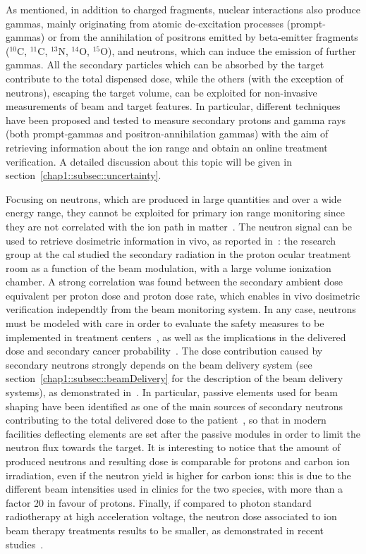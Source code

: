 As mentioned, in addition to charged fragments, nuclear interactions also produce gammas, mainly originating from atomic de-excitation processes (prompt-gammas) or from the annihilation of positrons emitted by beta-emitter fragments ($^{10}$C, $^{11}$C, $^{13}$N, $^{14}$O, $^{15}$O), and neutrons, which can induce the emission of further gammas. All the secondary particles which can be absorbed by the target contribute to the total dispensed dose, while the others (with the exception of neutrons), escaping the target volume, can be exploited for non-invasive measurements of beam and target features. In particular, different techniques have been proposed and tested to measure secondary protons and gamma rays (both prompt-gammas and positron-annihilation gammas) with the aim of retrieving information about the ion range and obtain an online treatment verification. A detailed discussion about this topic will be given in section~\ref{chap1::subsec::uncertainty}.

Focusing on neutrons, which are produced in large quantities and over a wide energy range, they cannot be exploited for primary ion range monitoring since they are not correlated with the ion path in matter~\parencite{Testa2010}. The neutron signal can be used to retrieve dosimetric information in vivo, as reported in~\cite{Carnicer2014}: the research group at the \gls{cal} studied the secondary radiation in the proton ocular treatment room as a  function of the beam modulation, with a large volume ionization chamber. A strong correlation was found between the secondary ambient dose equivalent per proton dose and proton dose rate, which enables in vivo dosimetric verification independtly from the beam monitoring system. In any case, neutrons must be modeled with care in order to evaluate the safety measures to be implemented in treatment centers~\parencite{Newhauser2002}, as well as the implications in the delivered dose and secondary cancer probability~\parencite{Newhauser2011}. The dose contribution caused by secondary neutrons strongly depends on the beam delivery system (see section~\ref{chap1::subsec::beamDelivery} for the description of the beam delivery systems), as demonstrated in~\cite{Gottschalk2006}. In particular, passive elements used for beam shaping have been identified as one of the main sources of secondary neutrons contributing to the total delivered dose to the patient~\parencite{Yan2002}, so that in modern facilities deflecting elements are set after the passive modules in order to limit the neutron flux towards the target. It is interesting to notice that the amount of produced neutrons and resulting dose is comparable for protons and carbon ion irradiation, even if the neutron yield is higher for carbon ions: this is due to the different beam intensities used in clinics for the two species, with more than a factor 20 in favour of protons. Finally, if compared to photon standard radiotherapy at high acceleration voltage, the neutron dose associated to ion beam therapy treatments results to be smaller, as demonstrated in recent studies~\parencite{Schneider2015}. 

